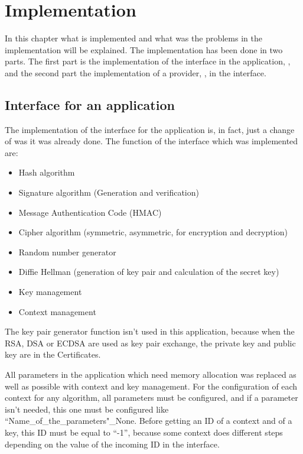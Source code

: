 \chapter{Implementation}

In this chapter what is implemented and what was the problems in the
implementation will be explained.
The implementation has been done in two parts. The first part is the
implementation of the interface in the application, \embtls, and the second part
the implementation of a provider, \tomcrypt, in the interface.

\section{Interface for an application}

The implementation of the interface for the application is, in fact, just a
change of was it was already done.
The function of the interface which was implemented are:
\begin{itemize}[noitemsep]
  \item Hash algorithm
  \item Signature algorithm (Generation and verification)
  \item Message Authentication Code (HMAC)
  \item Cipher algorithm (symmetric, asymmetric, for encryption and decryption)
  \item Random number generator
  \item Diffie Hellman (generation of key pair and calculation of the secret
  key)
  \item Key management
  \item Context management
\end{itemize}

The key pair generator function isn't used in this application, because when the
RSA, DSA or ECDSA are used as key pair exchange, the private key and public key
are in the Certificates.

All parameters in the application which need memory allocation was replaced as
well as possible with context and key management.
For the configuration of each context for any algorithm, all parameters must be
configured, and if a parameter isn't needed, this one must be configured like
``Name\_of\_the\_parameters"\_None.
Before getting an ID of a context and of a key, this ID must be equal to ``-1'',
because some context does different steps depending on the value of the incoming
ID in the interface.


